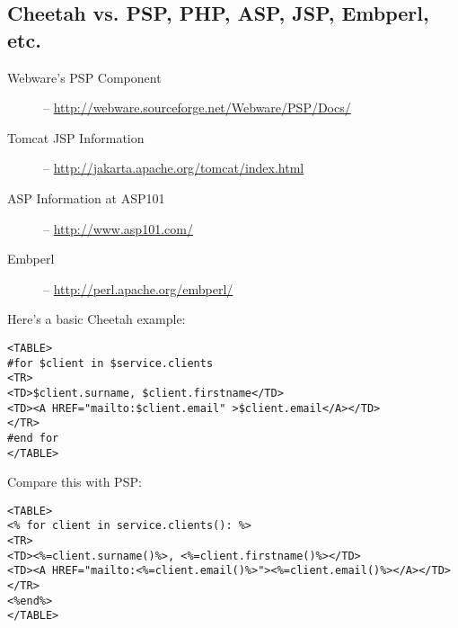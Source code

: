 \subsection{Cheetah vs. PSP, PHP, ASP, JSP, Embperl, etc.}
\label{comparisons.pspEtc}

\begin{description}
\item[Webware's PSP Component] -- \url{http://webware.sourceforge.net/Webware/PSP/Docs/}
\item[Tomcat JSP Information] -- \url{http://jakarta.apache.org/tomcat/index.html}
\item[ASP Information at ASP101] -- \url{http://www.asp101.com/}
\item[Embperl] -- \url{http://perl.apache.org/embperl/}
\end{description}


Here's a basic Cheetah example:
\begin{verbatim}
<TABLE>
#for $client in $service.clients
<TR>
<TD>$client.surname, $client.firstname</TD>
<TD><A HREF="mailto:$client.email" >$client.email</A></TD>
</TR>
#end for
</TABLE>
\end{verbatim}

Compare this with PSP:

\begin{verbatim}
<TABLE>
<% for client in service.clients(): %>
<TR>
<TD><%=client.surname()%>, <%=client.firstname()%></TD>
<TD><A HREF="mailto:<%=client.email()%>"><%=client.email()%></A></TD>
</TR>
<%end%>
</TABLE>
\end{verbatim}

